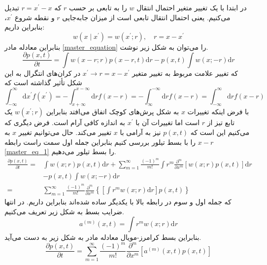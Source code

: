 در ابتدا با یک تغییر متغیر احتمال انتقال $w$ را به تابعی بر حسب $r$ که $r=x^\prime - x$ تبدیل می‌کنیم. یعنی احتمال انتقال تابعی است از میزان جابه‌جایی $r$ و نقطه شروع $x^\prime$، بنابراین داریم:
\begin{equation}
  w\left( x \mid x^{\prime} \right) = w\left(x^{\prime} ; r\right), \quad r=x-x^{\prime}
  \label{transition_cfv}
\end{equation}
بنابراین معادله مادر \ref{master_equation} را می‌توان به شکل زیر نوشت.
\begin{equation}
  \frac{\partial p(x, t)}{\partial t}=\int w(x-r ; r) p(x-r, t) \mathrm{d} r - p(x, t) \int w(x ;-r) \mathrm{d} r
  \label{master_eq_1}
\end{equation}
 که تغییر علامت مربوط به تغییر متغیر $x^\prime \rightarrow r = x - x^\prime$ در کران‌های انتگرال به این شکل تأثیر گذاشته است که
$$
  \int_{-\infty}^{\infty} \mathrm{d} x^{\prime} f\left(x^{\prime}\right)=-\int_{x+\infty}^{x-\infty} \mathrm{d} r f(x-r)=-\int_{\infty}^{-\infty} \mathrm{d} r f(x-r)=\int_{-\infty}^{\infty} \mathrm{d} r f(x-r)
$$
با فرض اینکه تغییرات $x$ به شکل پرش‌های کوچک اتفاق می‌افتد بنابراین $w(x^\prime;r)$ یک تابع تیز از $r$ است اما تغییرات آن با $x^\prime$ به اندازه کافی آرام است. فرض دیگری که می‌کنیم این است که $p(x,t)$ نیز به آرامی با $x$ تغییر می‌کند. حال می‌توانیم تغییر $x$ به $x-r$ را با بسط تیلور بررسی کنیم بنابراین جمله اول سمت راست رابطه \ref{master_eq_1} را بسط تیلور می‌دهیم.
$$
\begin{aligned} \frac{\partial p(x, t)}{\partial t}=& \int w(x ; r) p(x, t) \mathrm{d} r+\sum_{m=1}^{\infty} \frac{(-1)^{m}}{m !} \int r^{m} \frac{\partial^{m}}{\partial x^{m}}[w(x ; r) p(x, t)] \mathrm{d} r  \\ &-p(x, t) \int w(x ;-r) \mathrm{d} r \\=& \sum_{m=1}^{\infty} \frac{(-1)^{m}}{m !} \frac{\partial^{m}}{\partial x^{m}}\left\{\left[\int r^{m} w(x ; r) \mathrm{d} r \right] p(x, t)\right\} \end{aligned}
$$
که جمله اول و سوم در رابطه بالا با یکدیگر ساده شده‌اند بنابراین داریم.
در انتها ضرایب بسط به شکل زیر تعریف می‌کنیم.
\begin{equation}
  a^{(m)}(x, t)=\int r^{m} w(x ; r) \mathrm{d} r
  \label{jump_moments}
\end{equation}
بنابراین بسط کرامرز-مویال معادله مادر به شکل زیر به دست می‌آید. 
\begin{equation}
  \frac{\partial p(x, t)}{\partial t}=\sum_{m=1}^{\infty} \frac{(-1)^{m}}{m !} \frac{\partial^{m}}{\partial x^{m}}\left[a^{(m)}(x, t) p(x, t)\right]
  \label{kramers_moyal}
\end{equation}
